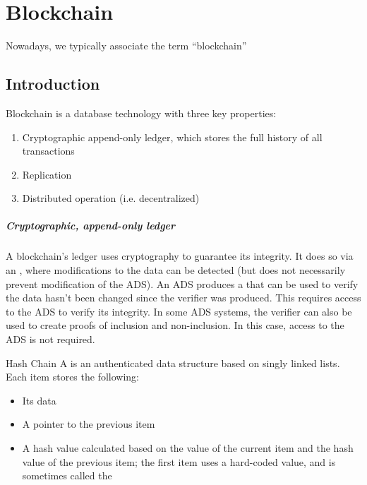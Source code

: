 \chapter{Blockchain}

Nowadays, we typically associate the term ``blockchain'' 

\section{Introduction}

\begin{dfnbox}{Blockchain}{}
     is a database technology with three key properties:
    \begin{enumerate}
        \item Cryptographic append-only ledger, which stores the full history of all transactions
        \item Replication
        \item Distributed operation (i.e. decentralized)
    \end{enumerate}
\end{dfnbox}

\paragraph{Cryptographic, append-only ledger}
A blockchain's ledger uses cryptography to guarantee its integrity. It does so via an , where modifications to the data can be detected (but does not necessarily prevent modification of the ADS). An ADS produces a  that can be used to verify the data hasn't been changed since the verifier was produced. This requires access to the ADS to verify its integrity. In some ADS systems, the verifier can also be used to create proofs of inclusion and non-inclusion. In this case, access to the ADS is not required.

\begin{dfnbox}{Hash Chain}{}
    A  is an authenticated data structure based on singly linked lists. Each item stores the following:
    \begin{itemize}
        \item Its data
        \item A pointer to the previous item
        \item A hash value calculated based on the value of the current item and the hash value of the previous item; the first item uses a hard-coded value, and is sometimes called the 
    \end{itemize}
\end{dfnbox}

